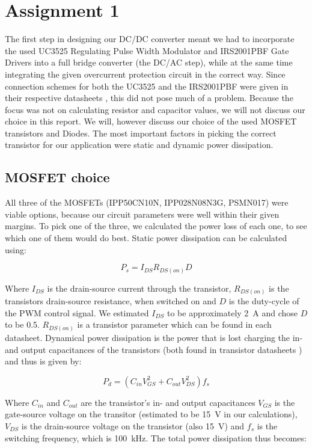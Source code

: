 \documentclass[11pt,titlepage]{report}
\begin{document}
\chapter*{Assignment 1}
The first step in designing our DC/DC converter meant we had to incorporate the used UC3525 Regulating Pulse Width Modulator and IRS2001PBF Gate Drivers into a full bridge converter (the DC/AC step), while at the same time integrating the given overcurrent protection circuit in the correct way. Since connection schemes for both the UC3525 and the IRS2001PBF were given in their respective datasheets \cite{uc3525a-datasheet,irs2001pbf-datasheet}, this did not pose much of a problem. Because the focus was not on calculating resistor and capacitor values, we will not discuss our choice in this report.
We will, however discuss our choice of the used MOSFET transistors and Diodes. The most important factors in picking the correct transistor for our application were static and dynamic power dissipation.

\section*{MOSFET choice}
All three of the MOSFETs (IPP50CN10N, IPP028N08N3G, PSMN017) were viable options, because our circuit parameters were well within their given margins. To pick one of the three, we calculated the power loss of each one, to see which one of them would do best.
Static power dissipation can be calculated using:

\begin{equation}
P_{s} = I_{DS}R_{DS(on)}D
\end{equation}

Where $I_{DS}$ is the drain-source current through the transistor, $R_{DS(on)}$ is the transistors drain-source resistance, when switched on and $D$ is the duty-cycle of the PWM control signal. We estimated $I_{DS}$ to be approximately \SI{2}{A} and chose $D$ to be \num{0.5}. $R_{DS(on)}$ is a transistor parameter which can be found in each datasheet.
Dynamical power dissipation is the power that is lost charging the in- and output capacitances of the transistors (both found in transistor datasheets \cite{IPP50CN10N-datasheet,IPP028N08N3G-datasheet,PSMN017-datasheet}) and thus is given by:

\begin{equation}
P_{d} = (C_{in}V_{GS}^2 + C_{out}V_{DS}^2)f_{s}
\end{equation}

Where $C_{in}$ and $C_{out}$ are the transistor's in- and output capacitances $V_{GS}$ is the gate-source voltage on the transitor (estimated to be \SI{15}{V} in our calculations), $V_{DS}$ is the drain-source voltage on the transistor (also \SI{15}{V}) and $f_{s}$ is the switching frequency, which is \SI{100}{kHz}.
The total power dissipation thus becomes:
\end{document}
